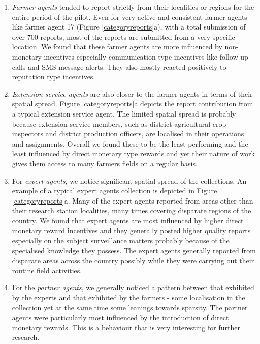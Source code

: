 \documentclass[letterpaper]{article} %
\begin{document}
\begin{enumerate}[-]
\item \emph{Farmer agents} tended to report strictly from their localities or regions for the entire period of the pilot. Even for very active and consistent farmer agents like farmer agent 17 (Figure \ref{categoryreports}a), with a total submission of over 700 reports, most of the reports are submitted from a very specific location. We found that these farmer agents are more influenced by non-monetary incentives especially communication type incentives like follow up calls and SMS message alerts. They also mostly reacted positively to reputation type incentives.

\item \emph{Extension service agents} are also closer to the farmer agents in terms of their spatial spread. Figure \ref{categoryreports}a depicts the report contribution from a typical extension service agent. The limited spatial spread is probably because extension service members, such as district agricultural crop inspectors and district production officers, are localised in their operations and assignments. Overall we found these to be the least performing and the least influenced by direct monetary type rewards and yet their nature of work gives them access to many farmers fields on a regular basis. 

\item For \emph{expert agents}, we notice significant spatial spread of the collections. An example of a typical expert agents collection is depicted in Figure \ref{categoryreports}a. Many of the expert agents reported from areas other than their research station localities, many times covering disparate regions of the country. We found that expert agents are most influenced by higher direct monetary reward incentives and they generally posted higher quality reports especially on the subject surveillance matters probably because of the specialised knowledge they possess. The expert agents generally reported from disparate areas across the country possibly while they were carrying out their routine field activities. 

\item For the \emph{partner agents}, we generally noticed a pattern between that exhibited by the experts and that exhibited by the farmers - some localisation in the collection yet at the same time some leanings towards sparsity. The partner agents were particularly most influenced by the introduction of direct monetary rewards. This is a behaviour that is very interesting for further research.
\end{enumerate}
\end{document}
